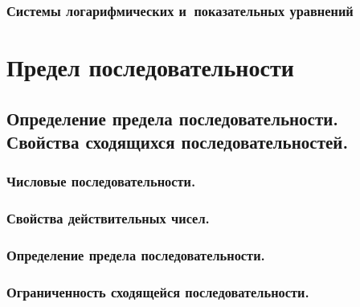 \documentclass[14pt, oneside]{extbook}
\begin{document}
\subsection{Системы логарифмических и~показательных уравнений}



\chapter{Предел последовательности}
\section{Определение предела последовательности. \\
Свойства сходящихся последовательностей.}
\subsection{Числовые последовательности.}

\subsection{Свойства действительных чисел.}

\subsection{Определение предела последовательности.}

\subsection{Ограниченность сходящейся последовательности.}

\end{document}
